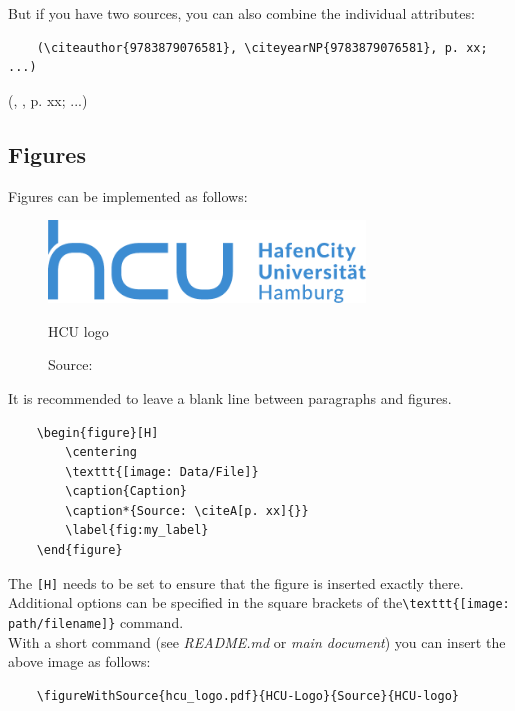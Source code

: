 But if you have two sources, you can also combine the individual attributes:

\begin{verbatim}
    (\citeauthor{9783879076581}, \citeyearNP{9783879076581}, p. xx; ...)
\end{verbatim}

(\citeauthor{9783879076581}, , p. xx; ...)


\subsection{Figures}

Figures can be implemented as follows:

\begin{figure}[H]
    \centering
    \includegraphics[width=0.75\textwidth]{Data/hcu_logo.pdf}
    \caption{HCU logo}
    \caption*{Source: } %
    \label{fig:HCU-logo}
\end{figure}

It is recommended to leave a blank line between paragraphs and figures.

\begin{verbatim}
    \begin{figure}[H]
        \centering
        \texttt{[image: Data/File]}
        \caption{Caption}
        \caption*{Source: \citeA[p. xx]{}}
        \label{fig:my_label}
    \end{figure}
\end{verbatim}

The \verb|[H]| needs to be set to ensure that the figure is inserted exactly there. Additional options can be specified in the square brackets of the\linebreak \verb|\texttt{[image: path/filename]}| command.\\

With a short command (see \textit{README.md} or \textit{main document}) you can insert the above image as follows:

\begin{verbatim}
    \figureWithSource{hcu_logo.pdf}{HCU-Logo}{Source}{HCU-logo}
\end{verbatim}


